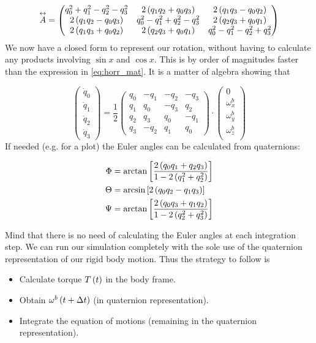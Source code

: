 $$
\overset{\leftrightarrow}{A}= 
\begin{pmatrix}
 q_0^2 + q_1^2 -q_2^2 -q_3^2  & 2\left(q_1q_2+q_0q_3\right)  & 2\left(q_1q_3-q_0q_2\right) \\
 2\left(q_1q_2-q_0q_3\right)  & q_0^2 -q_1^2 +q_2^2 -q_3^2 &  2\left(q_2q_3+q_0q_1\right) \\
  2\left(q_1q_3+q_0q_2\right) &  2\left(q_2q_3+q_0q_1\right)  & q_0^2 -q_1^2 -q_2^2 +q_3^2
\end{pmatrix} 
$$
We now have a closed form to represent our rotation, without having to calculate any products involving $\sin{x}$ and $\cos{x}$. This is by order of magnitudes faster than the expression in \eqref{eq:horr_mat}. It is a matter of algebra showing that


$$
\begin{pmatrix}
 \dot{q}_0\\
 \dot{q}_1\\
  \dot{q}_2\\
   \dot{q}_3
   \end{pmatrix} 
= \frac{1}{2}
\begin{pmatrix}
 q_0 & - q_1 &  -q_2 & -q_3 \\
 q_1 &   q_0 &  -q_3 &  q_2 \\
 q_2 &   q_3 &   q_0 & -q_1 \\
 q_3 & - q_2 &   q_1 &  q_0 
\end{pmatrix} 
\cdot
\begin{pmatrix}
 0\\
\omega^b_x\\
\omega^b_y\\
\omega^b_z\\
   \end{pmatrix} 
$$
If needed (e.g. for a plot) the Euler angles can be calculated from quaternions:

\begin{align}
\Phi &= \text{arctan}\left[ \frac{2\left(q_0q_1+q_2q_3\right)}{ 1- 2\left(q_1^2+q_2^2\right)}  \right]  \\
\Theta &= \text{arcsin}\left[ 2\left(q_0q_2-q_1q_3\right) \right]  \\
\Psi &= \text{arctan}\left[ \frac{2\left(q_0q_3+q_1q_2\right)}{ 1- 2\left(q_2^2+q_3^2\right)}  \right]  
\label{eq:quaternions_back}
\end{align}

Mind that there is no need of calculating the Euler angles at each integration step. We can run our simulation completely with the sole use of the quaternion representation of our rigid body motion. Thus the strategy to follow is

\begin{itemize}
\item Calculate torque $T\left(t\right)$ in the body frame.
\item Obtain $\omega^b\left(t+\Delta t\right)$ (in quaternion representation).
\item Integrate the equation of motions (remaining in the quaternion representation).
\end{itemize}








